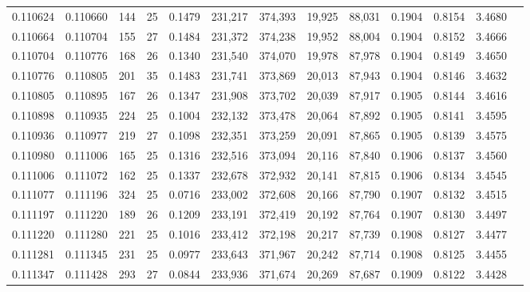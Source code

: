 \begin{tabular}{rrrrrrrrrrrrr}
0.110624 & 0.110660 & 144 &  25 &                                     0.1479 & 231,217 & 374,393 &  19,925 &  88,031 & 0.1904 & 0.8154 & 3.4680 \\
0.110664 & 0.110704 & 155 &  27 &                                     0.1484 & 231,372 & 374,238 &  19,952 &  88,004 & 0.1904 & 0.8152 & 3.4666 \\
0.110704 & 0.110776 & 168 &  26 &                                     0.1340 & 231,540 & 374,070 &  19,978 &  87,978 & 0.1904 & 0.8149 & 3.4650 \\
0.110776 & 0.110805 & 201 &  35 &                                     0.1483 & 231,741 & 373,869 &  20,013 &  87,943 & 0.1904 & 0.8146 & 3.4632 \\
0.110805 & 0.110895 & 167 &  26 &                                     0.1347 & 231,908 & 373,702 &  20,039 &  87,917 & 0.1905 & 0.8144 & 3.4616 \\
0.110898 & 0.110935 & 224 &  25 &                                     0.1004 & 232,132 & 373,478 &  20,064 &  87,892 & 0.1905 & 0.8141 & 3.4595 \\
0.110936 & 0.110977 & 219 &  27 &                                     0.1098 & 232,351 & 373,259 &  20,091 &  87,865 & 0.1905 & 0.8139 & 3.4575 \\
0.110980 & 0.111006 & 165 &  25 &                                     0.1316 & 232,516 & 373,094 &  20,116 &  87,840 & 0.1906 & 0.8137 & 3.4560 \\
0.111006 & 0.111072 & 162 &  25 &                                     0.1337 & 232,678 & 372,932 &  20,141 &  87,815 & 0.1906 & 0.8134 & 3.4545 \\
0.111077 & 0.111196 & 324 &  25 &                                     0.0716 & 233,002 & 372,608 &  20,166 &  87,790 & 0.1907 & 0.8132 & 3.4515 \\
0.111197 & 0.111220 & 189 &  26 &                                     0.1209 & 233,191 & 372,419 &  20,192 &  87,764 & 0.1907 & 0.8130 & 3.4497 \\
0.111220 & 0.111280 & 221 &  25 &                                     0.1016 & 233,412 & 372,198 &  20,217 &  87,739 & 0.1908 & 0.8127 & 3.4477 \\
0.111281 & 0.111345 & 231 &  25 &                                     0.0977 & 233,643 & 371,967 &  20,242 &  87,714 & 0.1908 & 0.8125 & 3.4455 \\
0.111347 & 0.111428 & 293 &  27 &                                     0.0844 & 233,936 & 371,674 &  20,269 &  87,687 & 0.1909 & 0.8122 & 3.4428 \\

\end{tabular}
